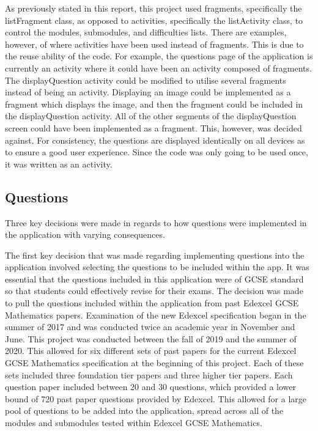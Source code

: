 \documentclass{article}
\begin{document}
As previously stated in this report, this project used fragments, specifically the listFragment class, as opposed to activities, specifically the listActivity class, to control the modules, submodules, and difficulties lists. There are examples, however, of where activities have been used instead of fragments. This is due to the reuse ability of the code. For example, the questions page of the application is currently an activity where it could have been an activity composed of fragments. The displayQuestion activity could be modified to utilise several fragments instead of being an activity. Displaying an image could be implemented as a fragment which displays the image, and then the fragment could be included in the displayQuestion activity. All of the other segments of the displayQuestion screen could have been implemented as a fragment. This, however, was decided against. For consistency, the questions are displayed identically on all devices as to ensure a good user experience. Since the code was only going to be used once, it was written as an activity. \par

\subsection{Questions}

Three key decisions were made in regards to how questions were implemented in the application with varying consequences. \par

The first key decision that was made regarding implementing questions into the application involved selecting the questions to be included within the app. It was essential that the questions included in this application were of GCSE standard so that students could effectively revise for their exams. The decision was made to pull the questions included within the application from past Edexcel GCSE Mathematics papers. Examination of the new Edexcel specification began in the summer of 2017 and was conducted twice an academic year in November and June. This project was conducted between the fall of 2019 and the summer of 2020. This allowed for six different sets of past papers for the current Edexcel GCSE Mathematics specification at the beginning of this project. Each of these sets included three foundation tier papers and three higher tier papers. Each question paper included between 20 and 30 questions, which provided a lower bound of 720 past paper questions provided by Edexcel. This allowed for a large pool of questions to be added into the application, spread across all of the modules and submodules tested within Edexcel GCSE Mathematics. \par
\end{document}
